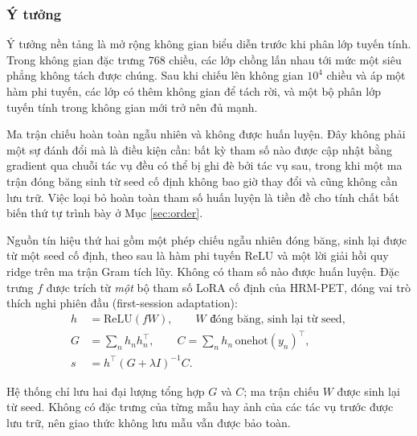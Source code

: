 \documentclass[11pt,a4paper]{article}
\begin{document}
\subsubsection{Ý tưởng}

Ý tưởng nền tảng là mở rộng không gian biểu diễn trước khi phân lớp tuyến tính.
Trong không gian đặc trưng $768$ chiều, các lớp chồng lấn nhau tới mức một siêu
phẳng không tách được chúng. Sau khi chiếu lên không gian $10^4$ chiều và áp một
hàm phi tuyến, các lớp có thêm không gian để tách rời, và một bộ phân lớp tuyến
tính trong không gian mới trở nên đủ mạnh.

Ma trận chiếu hoàn toàn ngẫu nhiên và không được huấn luyện. Đây không phải một
sự đánh đổi mà là điều kiện cần: bất kỳ tham số nào được cập nhật bằng gradient
qua chuỗi tác vụ đều có thể bị ghi đè bởi tác vụ sau, trong khi một ma trận đóng
băng sinh từ seed cố định không bao giờ thay đổi và cũng không cần lưu trữ. Việc
loại bỏ hoàn toàn tham số huấn luyện là tiền đề cho tính chất bất biến thứ tự
trình bày ở Mục \ref{sec:order}.

Nguồn tín hiệu thứ hai gồm một phép chiếu ngẫu nhiên đóng băng, sinh lại được từ
một seed cố định, theo sau là hàm phi tuyến ReLU và một lời giải hồi quy ridge
trên ma trận Gram tích lũy. Không có tham số nào được huấn luyện. Đặc trưng $f$
được trích từ \emph{một} bộ tham số LoRA cố định của HRM-PET, đóng vai trò thích
nghi phiên đầu (first-session adaptation):
\begin{align}
h &= \mathrm{ReLU}(f W), \qquad W \text{ đóng băng, sinh lại từ seed},\\
G &= \sum_n h_n h_n^{\top}, \qquad
C = \sum_n h_n\,\mathrm{onehot}(y_n)^{\top},\\
s &= h^{\top} (G + \lambda I)^{-1} C .
\label{eq:rp}
\end{align}

Hệ thống chỉ lưu hai đại lượng tổng hợp $G$ và $C$; ma trận chiếu $W$ được sinh
lại từ seed. Không có đặc trưng của từng mẫu hay ảnh của các tác vụ trước được
lưu trữ, nên giao thức không lưu mẫu vẫn được bảo toàn.
\end{document}
